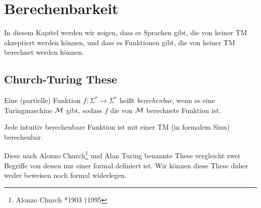 \section[Berechenbarkeit]{Berechenbarkeit}


\newcommand{\bintonat}{\operatorname{bin}}
\newcommand{\stdnum}{\operatorname{stdnum}}
\newcommand{\nattotm}{\operatorname{nat2tm}}
\newcommand{\bintotm}{\operatorname{bin2tm}}
\newcommand{\langtopower}{\operatorname{lang2power}}
\newcommand{\functopower}{\operatorname{func2power}}


In diesem Kapitel werden wir zeigen, 
dass es Sprachen gibt, die von keiner \ac{TM} akzeptiert werden können, und
dass es Funktionen gibt, die von keiner \ac{TM} berechnet werden können.


\subsection{Church-Turing These}
\begin{Def}[name={[berechenbare Funktion]}]\label{def:berechenbar}
	Eine (partielle) Funktion $f:\Sigma^*\rightarrow\Sigma^*$ heißt \emph{berechenbar}, wenn es eine Turingmaschine $\mathcal{M}$ gibt,
	sodass $f$ die von $\mathcal{M}$ berechnete Funktion ist.
\end{Def}


\begin{These*}
	Jede intuitiv berechenbare Funktion ist mit einer \ac{TM} (in formalem Sinn) berechenbar.
\end{These*}

Diese nach Alonzo Church\footnote{Alonzo Church *1903 †1995}
und Alan Turing benannte These vergleicht zwei Begriffe von denen nur einer
formal definiert ist.
Wir können diese These daher weder beweisen noch formal widerlegen.

